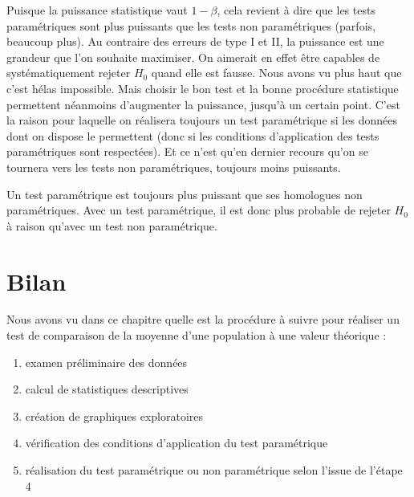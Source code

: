 \documentclass[
  a4paper,
  DIV=11,
  numbers=noendperiod,
  oneside]{scrreprt}
\providecommand{\tightlist}{%
  \setlength{\itemsep}{0pt}\setlength{\parskip}{0pt}}\usepackage{longtable,booktabs,array}
\begin{document}
Puisque la puissance statistique vaut \(1 - \beta\), cela revient à dire
que les tests paramétriques sont plus puissants que les tests non
paramétriques (parfois, beaucoup plus). Au contraire des erreurs de type
I et II, la puissance est une grandeur que l'on souhaite maximiser. On
aimerait en effet être capables de systématiquement rejeter \(H_0\)
quand elle est fausse. Nous avons vu plus haut que c'est hélas
impossible. Mais choisir le bon test et la bonne procédure statistique
permettent néanmoins d'augmenter la puissance, jusqu'à un certain point.
C'est la raison pour laquelle on réalisera toujours un test paramétrique
si les données dont on dispose le permettent (donc si les conditions
d'application des tests paramétriques sont respectées). Et ce n'est
qu'en dernier recours qu'on se tournera vers les tests non
paramétriques, toujours moins puissants.

\begin{tcolorbox}[enhanced jigsaw, breakable, toprule=.15mm, colbacktitle=quarto-callout-important-color!10!white, colframe=quarto-callout-important-color-frame, arc=.35mm, bottomtitle=1mm, opacityback=0, title=\textcolor{quarto-callout-important-color}{\faExclamation}\hspace{0.5em}{Important}, bottomrule=.15mm, colback=white, toptitle=1mm, rightrule=.15mm, leftrule=.75mm, opacitybacktitle=0.6, left=2mm, titlerule=0mm, coltitle=black]

Un test paramétrique est toujours plus puissant que ses homologues non
paramétriques. Avec un test paramétrique, il est donc plus probable de
rejeter \(H_0\) à raison qu'avec un test non paramétrique.

\end{tcolorbox}

\hypertarget{bilan}{%
\section{Bilan}\label{bilan}}

Nous avons vu dans ce chapitre quelle est la procédure à suivre pour
réaliser un test de comparaison de la moyenne d'une population à une
valeur théorique :

\begin{enumerate}
\def\labelenumi{\arabic{enumi}.}
\tightlist
\item
  examen préliminaire des données
\item
  calcul de statistiques descriptives
\item
  création de graphiques exploratoires
\item
  vérification des conditions d'application du test paramétrique
\item
  réalisation du test paramétrique ou non paramétrique selon l'issue de
  l'étape 4
\end{enumerate}
\end{document}
